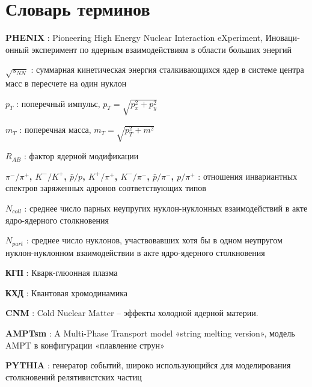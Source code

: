 \chapter*{Словарь терминов}             %

\textbf{PHENIX} : Pioneering High Energy Nuclear Interaction eXperiment, Иноваци­онный эксперимент по ядерным взаимодействиям в области больших энергий

\textbf{$\sqrt{s_{NN}}$} : суммарная кинетическая энергия сталкивающихся ядер в системе центра масс в пересчете на один нуклон

\textbf{$p_T$} : поперечный импульс, $p_T = \sqrt{p_x^2 +p_y^2}$

\textbf{$m_T$} : поперечная масса, $m_T = \sqrt{p_T^2 +m^2}$

\textbf{$R_{AB}$} : фактор ядерной модификации

\textbf{$\pi^-/\pi^+$, $K^-/K^+$, $\bar{p}/p$, $K^+/\pi^+$, $K^-/\pi^-$, $\bar{p}/\pi^-$, $p/\pi^+$} : отношения инвариантных спектров заряженных адронов соответствующих типов

\textbf{$N_{coll}$} : среднее число парных неупругих нуклон-нуклонных взаимодействий в акте ядро-ядерного столкновения

\textbf{$N_{part}$} : среднее число нуклонов, участвовавших хотя бы в одном неупругом нуклон-нуклонном взаимодействии в акте ядро-ядерного столкновения

\textbf{КГП} : Кварк-глюонная плазма

\textbf{КХД} : Квантовая хромодинамика

\textbf{CNM} : Cold Nuclear Matter -- эффекты холодной ядерной материи.

\textbf{AMPTsm} : A Multi-Phase Transport model «string melting version», мо­дель AMPT в конфигурации «плавление струн»

\textbf{PYTHIA} : генератор событий, широко использующийся для моделирования столкновений релятивистских частиц



